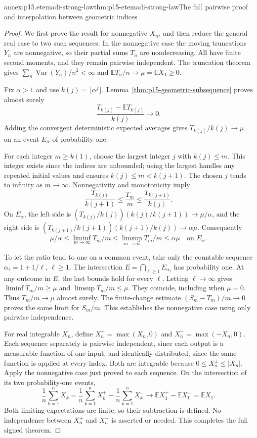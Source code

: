 \begin{annexitem}{annex:p15.etemadi-strong-law}{thm:p15-etemadi-strong-law}{The full pairwise proof and interpolation between geometric indices}
\begin{proof}
We first prove the result for nonnegative \(X_n\), and then reduce
the general real case to two such sequences. In the nonnegative case
the moving truncations \(Y_n\) are nonnegative, so their partial
sums \(T_n\) are nondecreasing. All have finite second moments,
and they remain pairwise independent. The truncation theorem gives
\(\sum_n\operatorname{Var}(Y_n)/n^2<\infty\) and
\(\mathbb ET_n/n\to\mu=\mathbb EX_1\geq0\).

Fix \(\alpha>1\) and use \(k(j)=\lfloor\alpha^j\rfloor\).
Lemma~\ref{thm:p15-geometric-subsequence} proves almost surely
\[
 \frac{T_{k(j)}-\mathbb ET_{k(j)}}{k(j)}\longrightarrow0.
\]
Adding the convergent deterministic expected averages gives
\(T_{k(j)}/k(j)\to\mu\) on an event \(E_\alpha\) of
probability one.

For each integer \(m\geq k(1)\), choose the largest integer
\(j\) with \(k(j)\leq m\). This integer exists since the
indices are unbounded; using the largest handles any repeated initial
values and ensures \(k(j)\leq m<k(j+1)\). The chosen \(j\)
tends to infinity as \(m\to\infty\). Nonnegativity and
monotonicity imply
\[
 \frac{T_{k(j)}}{k(j+1)}
       \leq\frac{T_m}{m}
       \leq\frac{T_{k(j+1)}}{k(j)}.
\]
On \(E_\alpha\), the left side is
\((T_{k(j)}/k(j))(k(j)/k(j+1))\to\mu/\alpha\),
and the right side is
\((T_{k(j+1)}/k(j+1))(k(j+1)/k(j))\to\alpha\mu\).
Consequently
\[
 \mu/\alpha\leq\liminf_{m\to\infty}T_m/m
       \leq\limsup_{m\to\infty}T_m/m\leq\alpha\mu
                                      \quad\text{on }E_\alpha.
\]

To let the ratio tend to one on a common event, take only the countable
sequence \(\alpha_\ell=1+1/\ell\), \(\ell\geq1\).
The intersection \(E=\bigcap_{\ell\geq1}E_{\alpha_\ell}\)
has probability one. At any outcome in \(E\), the last bounds
hold for every \(\ell\). Letting \(\ell\to\infty\) gives
\(\liminf T_m/m\geq\mu\) and \(\limsup T_m/m\leq\mu\).
They coincide, including when \(\mu=0\). Thus \(T_m/m\to\mu\)
almost surely. The finite-change estimate
\((S_m-T_m)/m\to0\) proves the same limit for \(S_m/m\).
This establishes the nonnegative case using only pairwise independence.

For real integrable \(X_n\), define
\(X_n^+=\max(X_n,0)\) and \(X_n^-=\max(-X_n,0)\).
Each sequence separately is pairwise independent, since each output
is a measurable function of one input, and identically distributed,
since the same function is applied at every index. Both are integrable
because \(0\leq X_n^\pm\leq|X_n|\). Apply the nonnegative case
just proved to each sequence. On the intersection of its two
probability-one events,
\[
 \frac1n\sum_{k=1}^nX_k
   =\frac1n\sum_{k=1}^nX_k^+
     -\frac1n\sum_{k=1}^nX_k^-
   \longrightarrow\mathbb EX_1^+-\mathbb EX_1^-=\mathbb EX_1.
\]
Both limiting expectations are finite, so their subtraction is
defined. No independence between \(X_n^+\) and \(X_n^-\) is
asserted or needed. This completes the full signed theorem.
\end{proof}
\end{annexitem}

